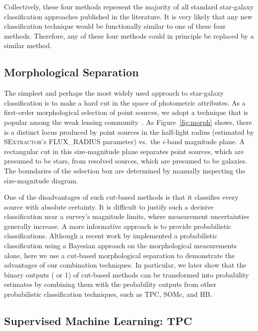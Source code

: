 Collectively, these four methods represent the majority of all
standard star-galaxy classification approaches published in the literature.
It is very likely that any new classification technique would be
functionally similar to one of these four methods.
Therefore, any of these four methods could in principle be replaced by a similar method. 


\subsection{Morphological Separation}

The simplest and perhaps the most widely used approach
to star-galaxy classification is
to make a hard cut in the space of photometric attributes.
As a first-order morphological selection of point sources,
we adopt a technique that is popular among the weak lensing 
community~\citep*{Kaiser1995}.
As Figure~\ref{fig:morph} shows, there is a distinct locus
produced by point sources in the half-light radius
(estimated by \textsc{SExtractor}'s FLUX\_RADIUS parameter)
vs.\ the $i$-band magnitude plane.
A rectangular cut in this size-magnitude plane separates point sources,
which are presumed to be stars,
from resolved sources,
which are presumed to be galaxies.
The boundaries of the selection box are determined by
manually inspecting the size-magnitude diagram.



One of the disadvantages of such cut-based methods is
that it classifies every source with absolute certainty.
It is difficult to justify such a decisive classification
near a survey's magnitude limits,
where measurement uncertainties generally increase.
A more informative approach is to provide probabilistic classifications.
Although a recent work by \citet{henrion2011bayesian}
implemented a probabilistic classification using a Bayesian approach
on the morphological measurements alone,
here we use a cut-based morphological separation
to demonstrate the advantages of our combination techniques.
In particular, we later show that
the binary outputs ( or 1) of cut-based methods
can be transformed into
probability estimates by combining them
with the probability outputs from other
probabilistic classification techniques,
such as TPC, SOMc, and HB.


\subsection{Supervised Machine Learning: TPC}
  \label{sec:tpc}

